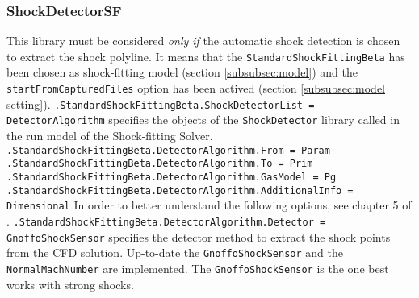 \documentclass[11pt,a4paper,oneside]{article}
\begin{document}
\subsubsection{ShockDetectorSF}
\label{subsubsec:detector}
This library must be considered \textit{only if} the automatic shock detection is chosen to extract the shock polyline. It means that the \texttt{StandardShockFittingBeta} has been chosen as shock-fitting model (section \ref{subsubsec:model}) and the \texttt{startFromCapturedFiles} option has been actived (section \ref{subsubsec:model setting}).
\newline
\newline
\hspace*{1cm} \texttt{.StandardShockFittingBeta.ShockDetectorList = DetectorAlgorithm}
\newline
\newline
specifies the objects of the \texttt{ShockDetector} library called in the run model of the Shock-fitting Solver.
\newline
\newline
\hspace*{1cm} \texttt{.StandardShockFittingBeta.DetectorAlgorithm.From = Param}
\newline
\hspace*{1cm} \texttt{.StandardShockFittingBeta.DetectorAlgorithm.To = Prim}
\newline
\hspace*{1cm} \texttt{.StandardShockFittingBeta.DetectorAlgorithm.GasModel = Pg}
\newline
\hspace*{1cm} \texttt{.StandardShockFittingBeta.DetectorAlgorithm.AdditionalInfo = Dimensional}
\newline
\newline
In order to better understand the following options, see chapter 5 of  \cite{valereport}.
\newline
\newline
\hspace*{1cm} \texttt{.StandardShockFittingBeta.DetectorAlgorithm.Detector = GnoffoShockSensor}
\newline
\newline
specifies the detector method to extract the shock points from the CFD solution. Up-to-date the \texttt{GnoffoShockSensor} and the \texttt{NormalMachNumber} are implemented. The \texttt{GnoffoShockSensor} is the one best works with strong shocks.
\newline
\newline
\end{document}
